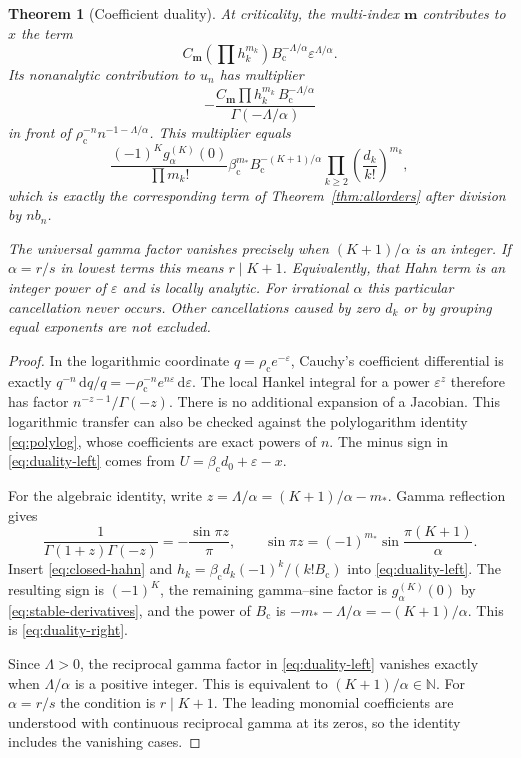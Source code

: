 \documentclass[11pt,a4paper]{article}
\numberwithin{equation}{section}
\newtheorem{theorem}{Theorem}[section]
\theoremstyle{definition}
\theoremstyle{remark}
\newcommand{\N}{\mathbb N}
\newcommand{\dd}{\,\mathrm d}
\newcommand{\bc}{\beta_{\mathrm c}}
\newcommand{\rhoc}{\rho_{\mathrm c}}
\newcommand{\Bc}{B_{\mathrm c}}
\newcommand{\m}{\boldsymbol m}
\begin{document}
\begin{theorem}[Coefficient duality]
\label{thm:duality}
At criticality, the multi-index $\m$ contributes to $x$ the term
\[
 C_{\m}\left(\prod h_k^{m_k}\right)
                    \Bc^{-\Lambda/\alpha}\varepsilon^{\Lambda/\alpha}.
\]
Its nonanalytic contribution to $u_n$ has multiplier
\begin{equation}\label{eq:duality-left}
 -\frac{C_{\m}\prod h_k^{m_k}\,\Bc^{-\Lambda/\alpha}}
          {\Gamma(-\Lambda/\alpha)}
\end{equation}
in front of $\rhoc^{-n}n^{-1-\Lambda/\alpha}$. This multiplier equals
\begin{equation}\label{eq:duality-right}
 \frac{(-1)^K g_\alpha^{(K)}(0)}{\prod m_k!}
       \bc^{m_*}\Bc^{-(K+1)/\alpha}
       \prod_{k\ge2}\left(\frac{d_k}{k!}\right)^{m_k},
\end{equation}
which is exactly the corresponding term of
Theorem~\ref{thm:allorders} after division by $n b_n$.

The universal gamma factor vanishes precisely when
$(K+1)/\alpha$ is an integer. If $\alpha=r/s$ in lowest terms this means
$r\mid K+1$. Equivalently, that Hahn term is an integer power of
$\varepsilon$ and is locally analytic. For irrational $\alpha$ this
particular cancellation never occurs. Other cancellations caused by
zero $d_k$ or by grouping equal exponents are not excluded.
\end{theorem}
\begin{proof}
In the logarithmic coordinate $q=\rhoc e^{-\varepsilon}$, Cauchy's
coefficient differential is exactly
$q^{-n}\dd q/q=-\rhoc^{-n}e^{n\varepsilon}\dd\varepsilon$.
The local Hankel integral for a power $\varepsilon^z$ therefore has
factor $n^{-z-1}/\Gamma(-z)$. There is no additional expansion of a
Jacobian. This logarithmic transfer can also be checked against the
polylogarithm identity \eqref{eq:polylog}, whose coefficients are exact
powers of $n$. The minus sign in \eqref{eq:duality-left} comes from
$U=\bc d_0+\varepsilon-x$.

For the algebraic identity, write $z=\Lambda/\alpha=(K+1)/\alpha-m_*$.
Gamma reflection gives
\[
 \frac1{\Gamma(1+z)\Gamma(-z)}=-\frac{\sin\pi z}{\pi},
 \qquad
 \sin\pi z=(-1)^{m_*}\sin\frac{\pi(K+1)}\alpha.
\]
Insert \eqref{eq:closed-hahn} and
$h_k=\bc d_k(-1)^k/(k!\Bc)$ into \eqref{eq:duality-left}.
The resulting sign is $(-1)^K$, the remaining gamma--sine factor is
$g_\alpha^{(K)}(0)$ by \eqref{eq:stable-derivatives}, and the power of
$\Bc$ is
$-m_*-\Lambda/\alpha=-(K+1)/\alpha$. This is
\eqref{eq:duality-right}.

Since $\Lambda>0$, the reciprocal gamma factor in
\eqref{eq:duality-left} vanishes exactly when $\Lambda/\alpha$ is a
positive integer. This is equivalent to $(K+1)/\alpha\in\N$.
For $\alpha=r/s$ the condition is $r\mid K+1$. The leading monomial
coefficients are understood with continuous reciprocal gamma at its
zeros, so the identity includes the vanishing cases.
\end{proof}
\end{document}
